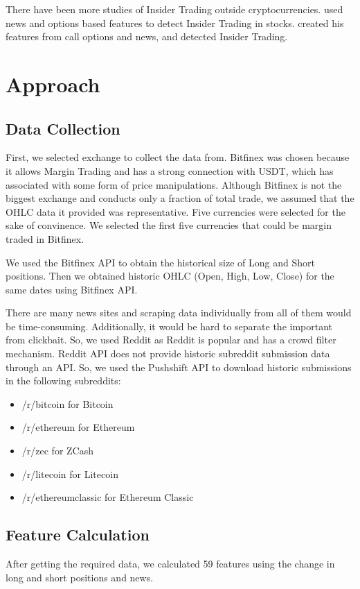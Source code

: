 \documentclass[letterpaper]{article}
\begin{document}
There have been more studies of Insider Trading
outside cryptocurrencies. \cite{donoho2004early} used news and options based features to detect Insider Trading
in stocks. \cite{donoho2004early} created his features from call options and news, and detected 
Insider Trading.

\section{Approach}
\label{sec:approach}
\subsection{Data Collection}
\label{sec:data_collection}
First, we selected exchange to collect the data from. Bitfinex was chosen because it allows Margin Trading and has
 a strong connection with USDT, which has associated with some form of price manipulations. Although Bitfinex 
 is not the biggest exchange and conducts only a fraction of total trade, we assumed that the OHLC 
 data it provided was representative. Five currencies were selected for the sake of 
convinence. We selected the first five currencies that could be margin traded 
in Bitfinex. \par

We used the Bitfinex API to obtain the historical size of Long and Short positions. Then we obtained 
historic OHLC (Open, High, Low, Close) for the same dates using Bitfinex API. \par

There are many news sites and scraping data individually from all of them would be time-consuming. 
Additionally, it would be hard to separate the important from clickbait. So, we used Reddit as 
Reddit is popular and has a crowd filter mechanism. Reddit API does not provide historic subreddit submission data 
through an API. So, we used the Pushshift API to download historic submissions in the following subreddits:

\begin{itemize}
    \item /r/bitcoin for Bitcoin
    \item /r/ethereum for Ethereum
    \item /r/zec for ZCash
    \item /r/litecoin for Litecoin
    \item /r/ethereumclassic for Ethereum Classic
\end{itemize}

\subsection{Feature Calculation}
\label{sec:features}
After getting the required data, we calculated 59 features using the change in long and short positions 
and news. \par
\end{document}
